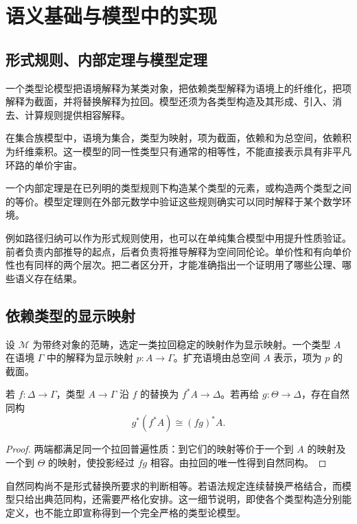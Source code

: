 \chapter{语义基础与模型中的实现}
\section{形式规则、内部定理与模型定理}
\begin{definition}[类型论的模型]
一个类型论模型把语境解释为某类对象，把依赖类型解释为语境上的纤维化，把项解释为截面，并将替换解释为拉回。模型还须为各类型构造及其形成、引入、消去、计算规则提供相容解释。
\end{definition}
\begin{example}
在集合族模型中，语境为集合，类型为映射，项为截面，依赖和为总空间，依赖积为纤维乘积。这一模型的同一性类型只有通常的相等性，不能直接表示具有非平凡环路的单价宇宙。
\end{example}
\begin{definition}[内部推导]
一个内部定理是在已列明的类型规则下构造某个类型的元素，或构造两个类型之间的等价。模型定理则在外部元数学中验证这些规则确实可以同时解释于某个数学环境。
\end{definition}
\begin{remark}
例如路径归纳可以作为形式规则使用，也可以在单纯集合模型中用提升性质验证。前者负责内部推导的起点，后者负责将推导解释为空间同伦论。单价性和有向单价性也有同样的两个层次。把二者区分开，才能准确指出一个证明用了哪些公理、哪些语义存在结果。
\end{remark}

\section{依赖类型的显示映射}
\begin{definition}[显示映射]
设 $\mathcal M$ 为带终对象的范畴，选定一类拉回稳定的映射作为显示映射。一个类型 $A$ 在语境 $\Gamma$ 中的解释为显示映射 $p:A\to\Gamma$。扩充语境由总空间 $A$ 表示，项为 $p$ 的截面。
\end{definition}
\begin{proposition}[替换的相容]
若 $f:\Delta\to\Gamma$，类型 $A\to\Gamma$ 沿 $f$ 的替换为 $f^*A\to\Delta$。若再给 $g:\Theta\to\Delta$，存在自然同构
\[
g^*(f^*A)\cong(fg)^*A.
\]
\end{proposition}
\begin{proof}
两端都满足同一个拉回普遍性质：到它们的映射等价于一个到 $A$ 的映射及一个到 $\Theta$ 的映射，使投影经过 $fg$ 相容。由拉回的唯一性得到自然同构。
\end{proof}
\begin{remark}
自然同构尚不是形式替换所要求的判断相等。若语法规定连续替换严格结合，而模型只给出典范同构，还需要严格化安排。这一细节说明，即使各个类型构造分别能定义，也不能立即宣称得到一个完全严格的类型论模型。
\end{remark}

